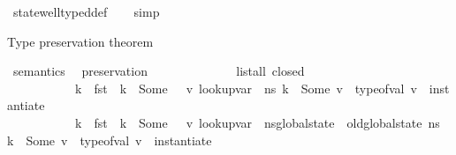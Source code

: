\begin{isabellebody}
\ state{\isacharunderscore}{\kern0pt}well{\isacharunderscore}{\kern0pt}typed{\isacharunderscore}{\kern0pt}def\isanewline
\ \ \isamarkupfalse%
\ simp%
\endisatagproof
{\isafoldproof}%
%
\isadelimproof
%
\endisadelimproof
%
\begin{isamarkuptext}%
Type preservation theorem%
\end{isamarkuptext}\isamarkuptrue%
\isamarkupfalse%
\ semantics\ \isanewline
\isanewline
{}\isamarkupfalse%
\ preservation{\isacharcolon}{\kern0pt}\isanewline
\ \ \ \isanewline
\ \ \ \ \ \ \ \ \ \ {\isachardoublequoteopen}list{\isacharunderscore}{\kern0pt}all\ closed\ {\isasymOmega}{\isachardoublequoteclose}\ \isanewline
\ \ \ \ \ \ \ \ \ \ {\isachardoublequoteopen}{\isasymforall}\ k\ {\isasymtau}{\isacharprime}{\kern0pt}{\isachardot}{\kern0pt}\ {\isacharparenleft}{\kern0pt}{\isacharparenleft}{\kern0pt}fst\ {\isasymDelta}{\isacharparenright}{\kern0pt}\ k\ {\isacharequal}{\kern0pt}\ Some\ {\isasymtau}{\isacharprime}{\kern0pt}{\isacharparenright}{\kern0pt}\ {\isasymlongrightarrow}\ {\isacharparenleft}{\kern0pt}{\isasymexists}v{\isachardot}{\kern0pt}\ {\isacharparenleft}{\kern0pt}lookup{\isacharunderscore}{\kern0pt}var\ {\isasymLambda}\ n{\isacharunderscore}{\kern0pt}s\ k\ {\isacharequal}{\kern0pt}\ Some\ v{\isacharparenright}{\kern0pt}\ {\isasymand}\ type{\isacharunderscore}{\kern0pt}of{\isacharunderscore}{\kern0pt}val\ v\ {\isacharequal}{\kern0pt}\ instantiate\ {\isasymOmega}\ {\isasymtau}{\isacharprime}{\kern0pt}{\isacharparenright}{\kern0pt}{\isachardoublequoteclose}\ \isanewline
\ \ \ \ \ \ \ \ \ \ {\isachardoublequoteopen}{\isasymforall}\ k\ {\isasymtau}{\isacharprime}{\kern0pt}{\isachardot}{\kern0pt}\ {\isacharparenleft}{\kern0pt}{\isacharparenleft}{\kern0pt}fst\ {\isasymDelta}{\isacharparenright}{\kern0pt}\ k\ {\isacharequal}{\kern0pt}\ Some\ {\isasymtau}{\isacharprime}{\kern0pt}{\isacharparenright}{\kern0pt}\ {\isasymlongrightarrow}\ {\isacharparenleft}{\kern0pt}{\isasymexists}v{\isachardot}{\kern0pt}\ {\isacharparenleft}{\kern0pt}lookup{\isacharunderscore}{\kern0pt}var\ {\isasymLambda}\ {\isacharparenleft}{\kern0pt}n{\isacharunderscore}{\kern0pt}s{\isasymlparr}global{\isacharunderscore}{\kern0pt}state\ {\isacharcolon}{\kern0pt}{\isacharequal}{\kern0pt}\ old{\isacharunderscore}{\kern0pt}global{\isacharunderscore}{\kern0pt}state\ n{\isacharunderscore}{\kern0pt}s{\isasymrparr}{\isacharparenright}{\kern0pt}\ k\ {\isacharequal}{\kern0pt}\ Some\ v{\isacharparenright}{\kern0pt}\ {\isasymand}\ type{\isacharunderscore}{\kern0pt}of{\isacharunderscore}{\kern0pt}val\ v\ {\isacharequal}{\kern0pt}\ instantiate\ {\isasymOmega}\ {\isasymtau}{\isacharprime}{\kern0pt}{\isacharparenright}{\kern0pt}{\isachardoublequoteclose}\ \isanewline

\end{isabellebody}
